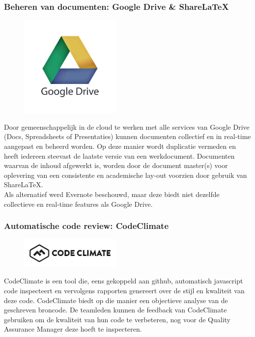 \documentclass{article}
\begin{document}
\clearpage

\subsubsection*{Beheren van documenten: Google Drive \& Share\LaTeX}

\begin{figure}[h!]
\centering
 \includegraphics[width=50mm]{google_drive.jpg}
\end{figure}

\noindent Door gemeenschappelijk in de cloud te werken met alle services van Google Drive (Docs, Spreadsheets of Presentaties) kunnen documenten collectief en in real-time aangepast en beheerd worden. Op deze manier wordt duplicatie vermeden en heeft iedereen steevast de laatste versie van een werkdocument. Documenten waarvan de inhoud afgewerkt is, worden door de document master(s) voor oplevering van een consistente en academische lay-out voorzien door gebruik van Share\LaTeX.\\
Als alternatief werd Evernote beschouwd, maar deze biedt niet dezelfde collectieve en real-time features als Google Drive. 
 
 
 \subsubsection*{Automatische code review: CodeClimate}

\begin{figure}[h!]
\centering
 \includegraphics[width=50mm]{codeClimate.jpg}
\end{figure}

\noindent CodeClimate is een tool die, eens gekoppeld aan github, automatisch javascript code inspecteert en vervolgens rapporten genereert over de stijl en kwaliteit van deze code. CodeClimate biedt op die manier een objectieve analyse van de geschreven broncode. De teamleden kunnen de feedback van CodeClimate gebruiken om de kwaliteit van hun code te verbeteren, nog voor de Quality Assurance Manager deze hoeft te inspecteren.  
\end{document}
